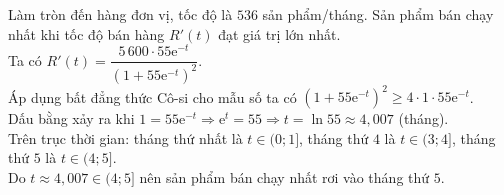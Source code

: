 \begin{ex}
{\begin{itemchoice}
			Làm tròn đến hàng đơn vị, tốc độ là $536$ sản phẩm/tháng.
			\itemch Sản phẩm bán chạy nhất khi tốc độ bán hàng $R'(t)$ đạt giá trị lớn nhất.\\
			Ta có $R'(t) = \dfrac{5\,600 \cdot 55\mathrm{e}^{-t}}{\left(1+55\mathrm{e}^{-t}\right)^2}$.\\ 
			Áp dụng bất đẳng thức Cô-si cho mẫu số ta có
			$\left(1+55\mathrm{e}^{-t}\right)^2 \ge 4 \cdot 1 \cdot 55\mathrm{e}^{-t}$.\\
			Dấu bằng xảy ra khi $1 = 55\mathrm{e}^{-t} \Rightarrow \mathrm{e}^t = 55 \Rightarrow t = \ln 55 \approx 4{,}007$ (tháng).\\
			Trên trục thời gian: tháng thứ nhất là $t \in (0; 1]$, tháng thứ $4$ là $t \in (3; 4]$, tháng thứ $5$ là $t \in (4; 5]$.\\ 
			Do $t \approx 4{,}007 \in (4; 5]$ nên sản phẩm bán chạy nhất rơi vào tháng thứ $5$.
		\end{itemchoice}
	}
\end{ex}

